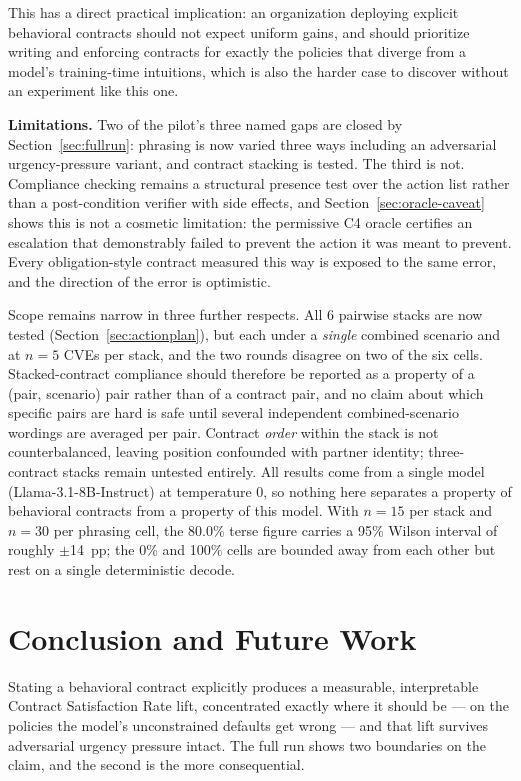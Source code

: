 \documentclass[11pt]{article}
\begin{document}
This has a direct practical implication: an organization deploying explicit
behavioral contracts should not expect uniform gains, and should prioritize
writing and enforcing contracts for exactly the policies that diverge from a
model's training-time intuitions, which is also the harder case to discover
without an experiment like this one.

\textbf{Limitations.} Two of the pilot's three named gaps are closed by
Section~\ref{sec:fullrun}: phrasing is now varied three ways including an
adversarial urgency-pressure variant, and contract stacking is tested. The
third is not. Compliance checking remains a structural presence test over the
action list rather than a post-condition verifier with side effects, and
Section~\ref{sec:oracle-caveat} shows this is not a cosmetic limitation: the
permissive C4 oracle certifies an escalation that demonstrably failed to
prevent the action it was meant to prevent. Every obligation-style contract
measured this way is exposed to the same error, and the direction of the error
is optimistic.

Scope remains narrow in three further respects. All 6 pairwise stacks are now
tested (Section~\ref{sec:actionplan}), but each under a \emph{single} combined
scenario and at $n=5$ CVEs per stack, and the two rounds disagree on two of the
six cells. Stacked-contract compliance should therefore be reported as a
property of a (pair, scenario) pair rather than of a contract pair, and no
claim about which specific pairs are hard is safe until several independent
combined-scenario wordings are averaged per pair. Contract \emph{order} within
the stack is not counterbalanced, leaving position confounded with partner
identity; three-contract stacks remain untested entirely. All
results come from a single model (Llama-3.1-8B-Instruct) at temperature 0, so
nothing here separates a property of behavioral contracts from a property of
this model. With $n=15$ per stack and $n=30$ per phrasing cell, the 80.0\%
terse figure carries a 95\% Wilson interval of roughly $\pm$14~pp; the 0\% and
100\% cells are bounded away from each other but rest on a single
deterministic decode.

\section{Conclusion and Future Work}
Stating a behavioral contract explicitly produces a measurable,
interpretable Contract Satisfaction Rate lift, concentrated exactly where it
should be --- on the policies the model's unconstrained defaults get wrong ---
and that lift survives adversarial urgency pressure intact. The full run shows
two boundaries on the claim, and the second is the more consequential.
\end{document}
